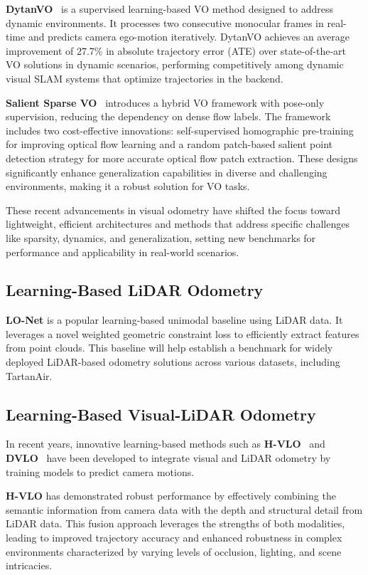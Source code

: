 \documentclass[11pt,a4paper]{article}
\begin{document}
\textbf{DytanVO}~\cite{dytanvo} is a supervised learning-based VO method designed to address dynamic environments. It processes two consecutive monocular frames in real-time and predicts camera ego-motion iteratively. DytanVO achieves an average improvement of 27.7\% in absolute trajectory error (ATE) over state-of-the-art VO solutions in dynamic scenarios, performing competitively among dynamic visual SLAM systems that optimize trajectories in the backend.

\textbf{Salient Sparse VO}~\cite{SuperSparse} introduces a hybrid VO framework with pose-only supervision, reducing the dependency on dense flow labels. The framework includes two cost-effective innovations: self-supervised homographic pre-training for improving optical flow learning and a random patch-based salient point detection strategy for more accurate optical flow patch extraction. These designs significantly enhance generalization capabilities in diverse and challenging environments, making it a robust solution for VO tasks.

These recent advancements in visual odometry have shifted the focus toward lightweight, efficient architectures and methods that address specific challenges like sparsity, dynamics, and generalization, setting new benchmarks for performance and applicability in real-world scenarios.

\subsection{Learning-Based LiDAR Odometry}

\textbf{LO-Net} \cite{lo-net} is a popular learning-based unimodal baseline using LiDAR data. It leverages a novel weighted geometric constraint loss to efficiently extract features from point clouds. This baseline will help establish a benchmark for widely deployed LiDAR-based odometry solutions across various datasets, including TartanAir.

\subsection{Learning-Based Visual-LiDAR Odometry}
In recent years, innovative learning-based methods such as \textbf{H-VLO}~\cite{hvlo} and \textbf{DVLO}~\cite{dvlo} have been developed to integrate visual and LiDAR odometry by training models to predict camera motions. 

\textbf{H-VLO} has demonstrated robust performance by effectively combining the semantic information from camera data with the depth and structural detail from LiDAR data. This fusion approach leverages the strengths of both modalities, leading to improved trajectory accuracy and enhanced robustness in complex environments characterized by varying levels of occlusion, lighting, and scene intricacies.
\end{document}
